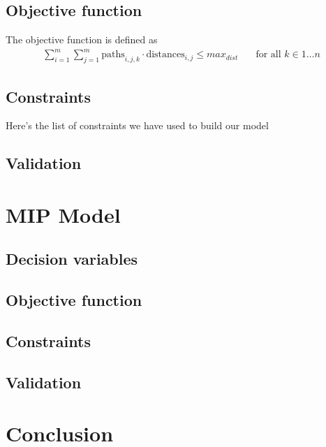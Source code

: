 \documentclass{article}
\begin{document}
\subsection{Objective function}
The objective function is defined as %
\begin{align*}
	\sum_{i=1}^m \sum_{j=1}^m \text{paths}_{i,j,k} \cdot \text{distances}_{i,j} \le max_{dist} \quad & \text{for all } k \in 1 \ldots n
\end{align*}
\subsection{Constraints}
Here's the list of constraints we have used to build our model
\subsection{Validation}
\section{MIP Model}
\subsection{Decision variables}
\subsection{Objective function}
\subsection{Constraints}
\subsection{Validation}
\section{Conclusion}
\end{document}
